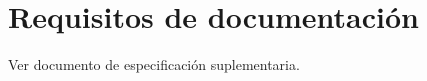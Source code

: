 \documentclass[12pt, a4paper, titlepage]{article}
\begin{document}
\section{Requisitos de documentación}

Ver documento de especificación suplementaria.



\end{document}
